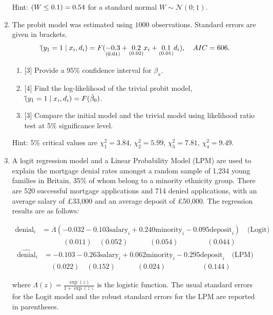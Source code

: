 \documentclass[12pt]{article}
\let\P\relax
\DeclareMathOperator{\P}{\mathbb{P}}
\newcommand{\hb}{\hat\beta}
\newcommand \cN{\mathcal{N}}
\begin{document}
\begin{enumerate}
    Hint: $\P(W \leq 0.1) = 0.54$ for a standard normal $W \sim \cN(0; 1)$.

    \item The probit model was estimated using $1000$ observations. 
    Standard errors are given in brackets.
    \[
    \hat\P(y_1 = 1 \mid x_i, d_i) = F(\underset{(0.01)}{-0.3} + \underset{(0.02)}{0.2} x_i + \underset{(0.01)}{0.1} d_i), \quad AIC = 606.
    \]
    \begin{enumerate}
        \item {[3]} Provide a 95\% confidence interval for $\beta_x$.
        \item {[4]} Find the log-likelihood of the trivial probit model, $\hat\P(y_1 = 1 \mid x_i, d_i) = F(\hb_0)$.
        \item {[3]} Compare the initial model and the trivial model using likelihood ratio test at 5\% significance level.
    \end{enumerate}

    Hint: 5\% critical values are $\chi^2_1 = 3.84$,  $\chi^2_2 = 5.99$, $\chi^2_3 = 7.81$, $\chi^2_4 = 9.49$.


    \item A logit regression model and a Linear Probability Model (LPM) are used to explain the mortgage denial rates amongst a random sample of 1,234 young families in Britain, 
    35\% of whom belong to a minority ethnicity group. 
    There are 520 successful mortgage applications and 714 denied applications, 
    with an average salary of \pounds 33,000 and an average deposit of \pounds 50,000. 
    The regression results are as follows:


    \begin{align*}
        \text{denial}_i &= \Lambda \left( -0.032 - 0.103 \text{salary}_i + 0.240 \text{minority}_i - 0.095 \text{deposit}_i \right) \quad \text{(Logit)} \\
        &\quad \quad \quad (0.011) \quad (0.052) \quad \quad \quad (0.054) \quad \quad \quad \quad (0.044)
    \end{align*}
    \begin{align*}
        \widehat{\text{denial}}_i &= -0.103 - 0.263 \text{salary}_i + 0.062 \text{minority}_i - 0.295 \text{deposit}_i \quad \text{(LPM)} \\
        &\quad (0.022) \quad (0.152) \quad \quad \quad (0.024) \quad \quad \quad \quad \quad (0.144)
    \end{align*}
    
    where $\Lambda(z) = \frac{\exp(z)}{1 + \exp(z)}$ is the logistic function. The usual standard errors for the Logit model and the robust standard errors for the LPM are reported in parentheses.
    

\end{enumerate}
\end{document}
